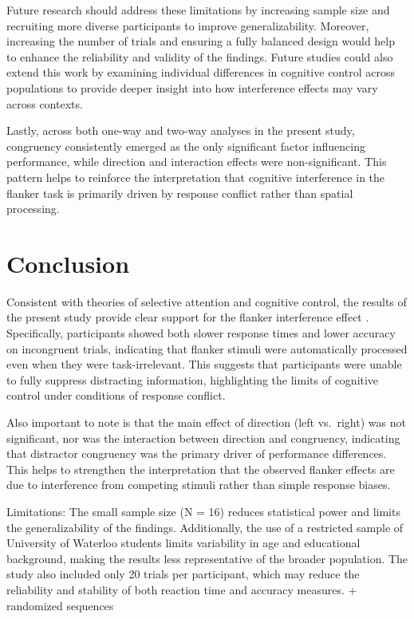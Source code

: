 \documentclass[
  authoryear,
  preprint]{elsarticle}
\begin{document}
Future research should address these limitations by increasing sample
size and recruiting more diverse participants to improve
generalizability. Moreover, increasing the number of trials and ensuring
a fully balanced design would help to enhance the reliability and
validity of the findings. Future studies could also extend this work by
examining individual differences in cognitive control across populations
to provide deeper insight into how interference effects may vary across
contexts.

Lastly, across both one-way and two-way analyses in the present study,
congruency consistently emerged as the only significant factor
influencing performance, while direction and interaction effects were
non-significant. This pattern helps to reinforce the interpretation that
cognitive interference in the flanker task is primarily driven by
response conflict rather than spatial processing.

\section{Conclusion}\label{conclusion}

Consistent with theories of selective attention and cognitive control,
the results of the present study provide clear support for the flanker
interference effect \citep{stoffels1988}. Specifically, participants
showed both slower response times and lower accuracy on incongruent
trials, indicating that flanker stimuli were automatically processed
even when they were task-irrelevant. This suggests that participants
were unable to fully suppress distracting information, highlighting the
limits of cognitive control under conditions of response conflict.

Also important to note is that the main effect of direction (left
vs.~right) was not significant, nor was the interaction between
direction and congruency, indicating that distractor congruency was the
primary driver of performance differences. This helps to strengthen the
interpretation that the observed flanker effects are due to interference
from competing stimuli rather than simple response biases.

Limitations: The small sample size (N = 16) reduces statistical power
and limits the generalizability of the findings. Additionally, the use
of a restricted sample of University of Waterloo students limits
variability in age and educational background, making the results less
representative of the broader population. The study also included only
20 trials per participant, which may reduce the reliability and
stability of both reaction time and accuracy measures. + randomized
sequences
\end{document}
